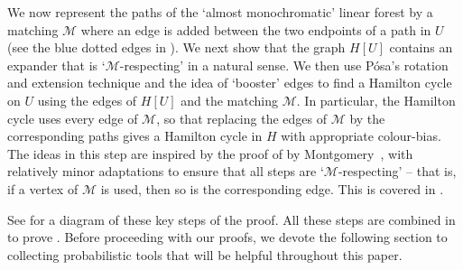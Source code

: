 \documentclass[10pt,a4paper,reqno]{amsart}
\begin{document}
\medskip
{} We now represent the paths of the `almost monochromatic' linear forest by a matching $\mathcal{M}$ where an edge is added between the two endpoints of a path in $U$ (see the blue dotted edges in ). We next show that the graph $H[U]$ contains an expander that is `$\mathcal{M}$-respecting' in a natural sense. We then use P\'osa's rotation and extension technique and the idea of `booster' edges to find a Hamilton cycle on $U$ using the edges of $H[U]$ and the matching $\mathcal{M}$. In particular, the Hamilton cycle uses every edge of $\mathcal{M}$, so that replacing the edges of $\mathcal{M}$ by the corresponding paths gives a Hamilton cycle in $H$ with appropriate colour-bias. The ideas in this step are inspired by the proof of  by Montgomery~\cite{Montgomery2019resilient}, with relatively minor adaptations to ensure that all steps are `$\mathcal{M}$-respecting' -- that is, if a vertex of $\mathcal{M}$ is used, then so is the corresponding edge. This is covered in .


\medskip
See  for a diagram of these key steps of the proof. All these steps are combined in  to prove . Before proceeding with our proofs, we devote the following section to collecting probabilistic tools that will be helpful throughout this paper.
\end{document}
